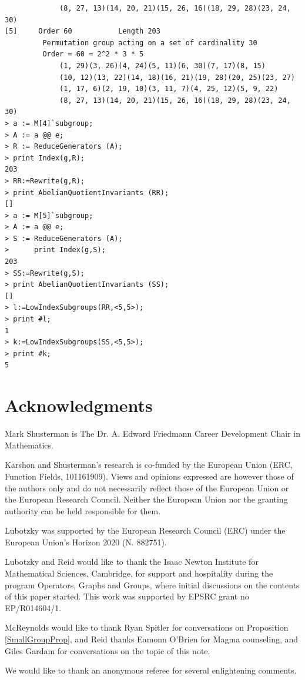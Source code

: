 \documentclass[11pt]{amsart}
\numberwithin{equation}{section}
\begin{document}
\begin{verbatim}
             (8, 27, 13)(14, 20, 21)(15, 26, 16)(18, 29, 28)(23, 24, 30)
[5]     Order 60           Length 203
         Permutation group acting on a set of cardinality 30
         Order = 60 = 2^2 * 3 * 5
             (1, 29)(3, 26)(4, 24)(5, 11)(6, 30)(7, 17)(8, 15)
             (10, 12)(13, 22)(14, 18)(16, 21)(19, 28)(20, 25)(23, 27)
             (1, 17, 6)(2, 19, 10)(3, 11, 7)(4, 25, 12)(5, 9, 22)
             (8, 27, 13)(14, 20, 21)(15, 26, 16)(18, 29, 28)(23, 24, 30)
> a := M[4]`subgroup;
> A := a @@ e;
> R := ReduceGenerators (A);
> print Index(g,R);
203
> RR:=Rewrite(g,R);
> print AbelianQuotientInvariants (RR);
[]
> a := M[5]`subgroup;
> A := a @@ e;                         
> S := ReduceGenerators (A);       
>      print Index(g,S);
203
> SS:=Rewrite(g,S);                    
> print AbelianQuotientInvariants (SS);
[]
> l:=LowIndexSubgroups(RR,<5,5>);
> print #l;
1
> k:=LowIndexSubgroups(SS,<5,5>);
> print #k;
5
\end{verbatim}

\section{Acknowledgments} 

Mark Shusterman is The Dr. A. Edward Friedmann Career Development Chair in Mathematics.

Karshon and Shusterman's research is co-funded by the European Union (ERC, Function Fields, 101161909). Views and opinions expressed are however those of the authors only and do not necessarily reflect those of the European Union or the European Research Council. Neither the European Union nor the granting authority can be held responsible for them.

Lubotzky was supported by the European Research Council (ERC) under
the European Union's Horizon 2020 (N. 882751).

Lubotzky and Reid would like to thank the Isaac Newton Institute for Mathematical Sciences, Cambridge, for support and hospitality during the program Operators, Graphs and Groups,  where initial discussions on the contents of this paper started.  This work was supported by EPSRC grant no EP/R014604/1.

McReynolds would like to thank Ryan Spitler for conversations on Proposition \ref{SmallGroupProp}, and Reid thanks Eamonn O'Brien for Magma counseling, and Giles Gardam for conversations on the topic of this note.

We would like to thank an anonymous referee for several enlightening comments.
\end{document}

